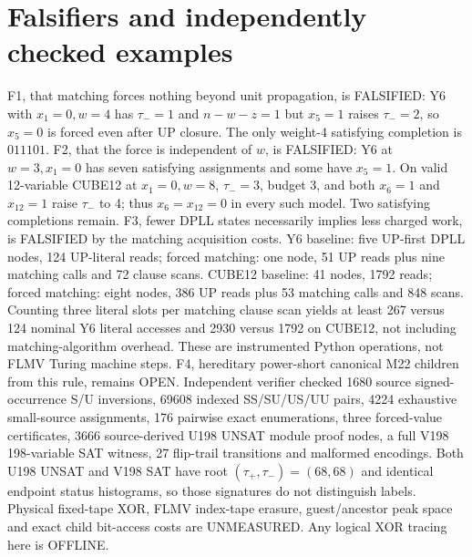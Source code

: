 \documentclass[11pt]{article}
\begin{document}
\section{Falsifiers and independently checked examples}
F1, that matching forces nothing beyond unit propagation, is FALSIFIED: Y6 with $x_1=0,w=4$ has $\tau_-=1$ and $n-w-z=1$ but $x_5=1$ raises $\tau_-=2$, so $x_5=0$ is forced even after UP closure. The only weight-4 satisfying completion is $011101$.
F2, that the force is independent of $w$, is FALSIFIED: Y6 at $w=3,x_1=0$ has seven satisfying assignments and some have $x_5=1$.
On valid 12-variable CUBE12 at $x_1=0,w=8$, $\tau_-=3$, budget 3, and both $x_6=1$ and $x_{12}=1$ raise $\tau_-$ to 4; thus $x_6=x_{12}=0$ in every such model. Two satisfying completions remain.
F3, fewer DPLL states necessarily implies less charged work, is FALSIFIED by the matching acquisition costs. Y6 baseline: five UP-first DPLL nodes, 124 UP-literal reads; forced matching: one node, 51 UP reads plus nine matching calls and 72 clause scans. CUBE12 baseline: 41 nodes, 1792 reads; forced matching: eight nodes, 386 UP reads plus 53 matching calls and 848 scans. Counting three literal slots per matching clause scan yields at least 267 versus 124 nominal Y6 literal accesses and 2930 versus 1792 on CUBE12, not including matching-algorithm overhead. These are instrumented Python operations, not FLMV Turing machine steps.
F4, hereditary power-short canonical M22 children from this rule, remains OPEN. Independent verifier checked 1680 source signed-occurrence S/U inversions, 69608 indexed SS/SU/US/UU pairs, 4224 exhaustive small-source assignments, 176 pairwise exact enumerations, three forced-value certificates, 3666 source-derived U198 UNSAT module proof nodes, a full V198 198-variable SAT witness, 27 flip-trail transitions and malformed encodings.
Both U198 UNSAT and V198 SAT have root $(\tau_+,\tau_-)=(68,68)$ and identical endpoint status histograms, so those signatures do not distinguish labels. Physical fixed-tape XOR, FLMV index-tape erasure, guest/ancestor peak space and exact child bit-access costs are UNMEASURED. Any logical XOR tracing here is OFFLINE.
\end{document}
